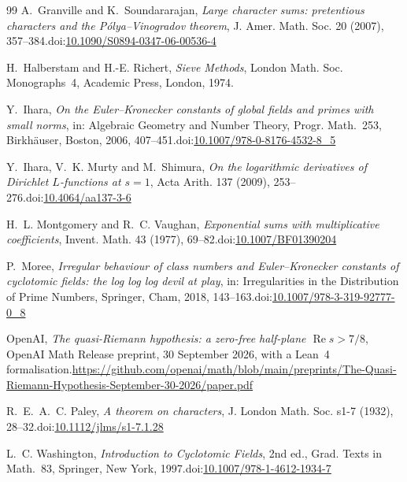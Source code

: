\documentclass[12pt]{amsart}
\numberwithin{equation}{section}
\theoremstyle{definition}
\renewcommand{\Re}{\operatorname{Re}}
\begin{document}
\begin{thebibliography}{99}
 A.~Granville and K.~Soundararajan, \emph{Large character sums: pretentious
characters and the P\'olya--Vinogradov theorem}, J. Amer. Math. Soc. 20 (2007),
357--384.\newline doi:\href{https://doi.org/10.1090/S0894-0347-06-00536-4}{10.1090/S0894-0347-06-00536-4}

 H.~Halberstam and H.-E. Richert, \emph{Sieve Methods}, London Math. Soc.
Monographs~4, Academic Press, London, 1974.

 Y.~Ihara, \emph{On the Euler--Kronecker constants of global fields and primes
with small norms}, in: Algebraic Geometry and Number Theory, Progr. Math.~253, Birkh\"auser,
Boston, 2006, 407--451.\newline doi:\href{https://doi.org/10.1007/978-0-8176-4532-8_5}{10.1007/978-0-8176-4532-8\_5}

 Y.~Ihara, V.~K. Murty and M.~Shimura, \emph{On the logarithmic derivatives of
Dirichlet $L$-functions at $s=1$}, Acta Arith. 137 (2009), 253--276.\newline doi:\href{https://doi.org/10.4064/aa137-3-6}{10.4064/aa137-3-6}

 H.~L. Montgomery and R.~C. Vaughan, \emph{Exponential sums with multiplicative
coefficients}, Invent. Math. 43 (1977), 69--82.\newline doi:\href{https://doi.org/10.1007/BF01390204}{10.1007/BF01390204}

 P.~Moree, \emph{Irregular behaviour of class numbers and Euler--Kronecker
constants of cyclotomic fields: the log log log devil at play}, in: Irregularities in the
Distribution of Prime Numbers, Springer, Cham, 2018, 143--163.\newline doi:\href{https://doi.org/10.1007/978-3-319-92777-0_8}{10.1007/978-3-319-92777-0\_8}

 OpenAI, \emph{The quasi-Riemann hypothesis: a zero-free half-plane
$\Re s>7/8$}, OpenAI Math Release preprint, 30 September 2026, with a Lean~4 formalisation.\newline \url{https://github.com/openai/math/blob/main/preprints/The-Quasi-Riemann-Hypothesis-September-30-2026/paper.pdf}

 R.~E.~A.~C. Paley, \emph{A theorem on characters}, J. London Math. Soc.
s1-7 (1932), 28--32.\newline doi:\href{https://doi.org/10.1112/jlms/s1-7.1.28}{10.1112/jlms/s1-7.1.28}

 L.~C. Washington, \emph{Introduction to Cyclotomic Fields}, 2nd ed., Grad. Texts
in Math.~83, Springer, New York, 1997.\newline doi:\href{https://doi.org/10.1007/978-1-4612-1934-7}{10.1007/978-1-4612-1934-7}

\end{thebibliography}
\endgroup
\end{document}
